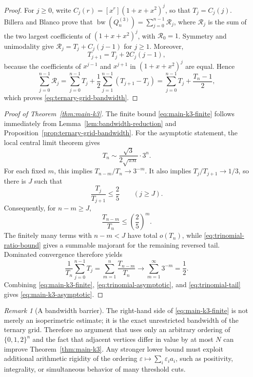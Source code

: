 \documentclass[11pt]{article}
\numberwithin{equation}{section}
\theoremstyle{definition}
\theoremstyle{remark}
\newtheorem{remark}[theorem]{Remark}
\newcommand{\eps}{\varepsilon}
\newcommand{\bw}{\operatorname{bw}}
\begin{document}
\begin{proof}
For $j\ge0$, write $C_j(r)=[x^r](1+x+x^2)^j$, so that $T_j=C_j(j)$. Billera and Blanco prove that $\bw(Q_n^{(3)})=\sum_{j=0}^{n-1}\mathcal R_j$, where $\mathcal R_j$ is the sum of the two largest coefficients of $(1+x+x^2)^j$, with $\mathcal R_0=1$. Symmetry and unimodality give $\mathcal R_j=T_j+C_j(j-1)$ for $j\ge1$. Moreover,
\begin{equation}\label{eq:neighbor-trinomial}
T_{j+1}=T_j+2C_j(j-1),
\end{equation}
because the coefficients of $x^{j-1}$ and $x^{j+1}$ in $(1+x+x^2)^j$ are equal. Hence
\[
\sum_{j=0}^{n-1}\mathcal R_j
 =\sum_{j=0}^{n-1}T_j
  +\frac12\sum_{j=1}^{n-1}(T_{j+1}-T_j)
 =\sum_{j=0}^{n-1}T_j+\frac{T_n-1}{2},
\]
which proves \eqref{eq:ternary-grid-bandwidth}.
\end{proof}

\begin{proof}[Proof of Theorem~\ref{thm:main-k3}]
The finite bound \eqref{eq:main-k3-finite} follows immediately from Lemma~\ref{lem:bandwidth-reduction} and Proposition~\ref{prop:ternary-grid-bandwidth}. For the asymptotic statement, the local central limit theorem gives
\begin{equation}\label{eq:trinomial-asymptotic}
T_n\sim\frac{\sqrt3}{2\sqrt{\pi n}}\cdot 3^n.
\end{equation}
For each fixed $m$, this implies $T_{n-m}/T_n\to3^{-m}$. It also implies $T_j/T_{j+1}\to1/3$, so there is $J$ such that
\begin{equation}\label{eq:trinomial-ratio-bound}
\frac{T_j}{T_{j+1}}\le\frac25
\qquad (j\ge J).
\end{equation}
Consequently, for $n-m\ge J$,
\[
\frac{T_{n-m}}{T_n}\le\left(\frac25\right)^m.
\]
The finitely many terms with $n-m<J$ have total $o(T_n)$, while \eqref{eq:trinomial-ratio-bound} gives a summable majorant for the remaining reversed tail. Dominated convergence therefore yields
\begin{equation}\label{eq:trinomial-tail}
\frac1{T_n}\sum_{j=0}^{n-1}T_j
 =\sum_{m=1}^{n}\frac{T_{n-m}}{T_n}
 \longrightarrow\sum_{m=1}^{\infty}3^{-m}=\frac12.
\end{equation}
Combining \eqref{eq:main-k3-finite}, \eqref{eq:trinomial-asymptotic}, and \eqref{eq:trinomial-tail} gives \eqref{eq:main-k3-asymptotic}.
\end{proof}

\begin{remark}[A bandwidth barrier]\label{rem:bandwidth-barrier}
The right-hand side of \eqref{eq:main-k3-finite} is not merely an isoperimetric estimate; it is the exact unrestricted bandwidth of the ternary grid. Therefore no argument that uses only an arbitrary ordering of $\{0,1,2\}^n$ and the fact that adjacent vertices differ in value by at most $N$ can improve Theorem~\ref{thm:main-k3}. Any stronger lower bound must exploit additional arithmetic rigidity of the ordering $\eps\mapsto\sum_i\eps_i a_i$, such as positivity, integrality, or simultaneous behavior of many threshold cuts.
\end{remark}
\end{document}
